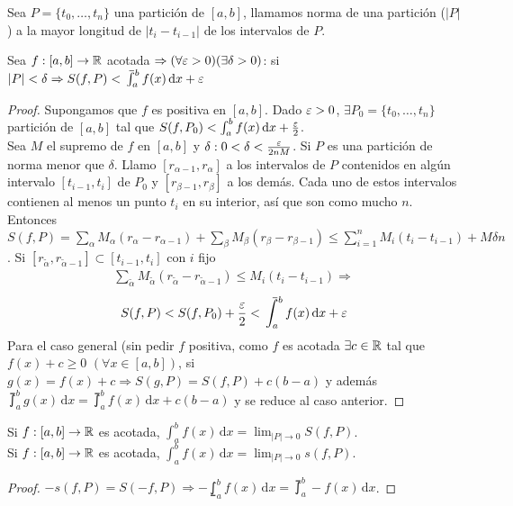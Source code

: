 \begin{definition}
  Sea \(P = \{t_0, \ldots, t_n\} \) una partición de \([a, b]\), llamamos norma de una partición (\(|P|\)) a la mayor longitud de \(|t_i - t_{i-1}|\)  de los intervalos de \(P\).
\end{definition}

\begin{theorem}
  Sea \(f: [a, b] \to \mathbb{R} \) acotada \(\Rightarrow (\forall \varepsilon > 0)(\exists \delta > 0) \): si \(|P| < \delta \Rightarrow S(f, P) < \upint_a^b f(x) \, \mathrm{d}x + \e \)
  \begin{proof}
    Supongamos que \(f\) es positiva en \([a, b]\). Dado \(\varepsilon > 0\), \(\exists P_0 = \{t_0, \ldots, t_n\} \) partición de \([a, b]\) tal que \(S(f, P_0) < \int_a^b f(x) \, \mathrm{d}x + \frac{\varepsilon}{2} \). \\
    Sea \(M\) el supremo de \(f\) en \([a, b]\) y \(\delta : 0 < \delta < \frac{\varepsilon}{2nM} \). Si \(P\) es una partición de norma menor que \(\delta \). Llamo \([r_{\alpha - 1}, r_{\alpha}]\) a los intervalos de \(P\) contenidos en algún intervalo \([t_{i-1}, t_i]\) de \(P_0\) y \([r_{\beta - 1}, r_{\beta}]\) a los demás. Cada uno de estos intervalos contienen al menos un punto \(t_i\) en su interior, así que son como mucho \(n\). Entonces \(S(f, P) = \sum_{\alpha} M_{\alpha} (r_{\alpha} - r_{\alpha - 1}) + \sum_{\beta} M_{\beta} (r_{\beta} - r_{\beta - 1}) \leq \sum_{i = 1}^n M_i (t_i - t_{i-1}) + M \delta n\).
    Si \([r_{\tilde{\alpha}}, r_{\tilde{\alpha}-1}] \subset [t_{i-1}, t_i]\) con \(i\) fijo \begin{align*}
      \sum_{\tilde{\alpha}} M_{\tilde{\alpha}} (r_{\tilde{\alpha}} - r_{\tilde{\alpha}-1}) \leq M_i (t_i - t_{i-1}) \Rightarrow
    \end{align*}
    \begin{align*}
      S(f, P) < S(f, P_0) + \frac{\e}{2} < \upint_a^b f(x) \, \mathrm{d}x + \e
    \end{align*}
    Para el caso general (sin pedir \(f\) positiva, como \(f\) es acotada \(\exists c \in \mathbb{R} \) tal que \(f(x) + c \geq 0\) \((\forall x \in [a, b])\), si \(g(x) = f(x) + c \Rightarrow S(g, P) = S(f, P) + c (b-a)\) y además \(\upint_a^b g(x) \, \mathrm{d}x = \upint_a^b f(x) \, \mathrm{d}x + c (b-a)\) y se reduce al caso anterior.
  \end{proof}
\end{theorem}


\begin{corollary}
  Si \(f: [a, b] \to \mathbb{R} \) es acotada, \(\int_a^b f(x) \, \mathrm{d}x = \lim_{|P| \to 0} S(f, P)\). \\
  Si \(f: [a, b] \to \mathbb{R} \) es acotada, \(\int_a^b f(x) \, \mathrm{d}x = \lim_{|P| \to 0} s(f, P)\).
  \begin{proof}
    \(-s(f, P) = S(-f, P) \Rightarrow - \lowint_a^b f(x)\, \mathrm{d}x = \upint_a^b -f(x) \, \mathrm{d}x\).
  \end{proof}
\end{corollary}

